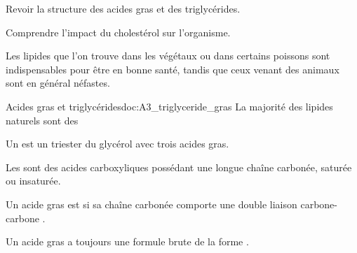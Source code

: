 \teteTermStssBiom
\vspace*{-38pt}

\begin{objectifs}
  \item Revoir la structure des acides gras et des triglycérides.
  \item Comprendre l'impact du cholestérol sur l'organisme.
\end{objectifs}

\begin{contexte}
  Les lipides que l'on trouve dans les végétaux ou dans certains poissons sont indispensables pour être en bonne santé, tandis que ceux venant des animaux sont en général néfastes.
  
\end{contexte}


\begin{doc}{Acides gras et triglycérides}{doc:A3_triglyceride_gras}
  La majorité des lipides naturels sont des 
  \begin{importants}
    Un  est un triester du glycérol avec trois acides gras.
    
    Les  sont des acides carboxyliques possédant une longue chaîne carbonée, saturée ou insaturée.
    
    Un acide gras est  si sa chaîne carbonée comporte une double liaison carbone-carbone .
  \end{importants}
  Un acide gras  a toujours une formule brute de la forme .
\end{doc}

